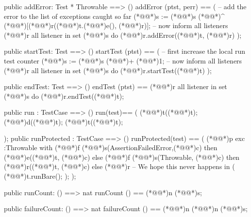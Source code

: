\documentclass[a4paper]{article}
\begin{document}
\begin{vdm_al}
  public addError: Test * Throwable ==> ()
  addError (ptst, perr) ==
    ( -- add the error to the list of exceptions caught so far
      (*@@*)s := (*@@*)s (*@\vdmnotcovered{}@*)^ (*@\vdmnotcovered{}@*)[(*@@*)r((*@@*)t.(*@@*)e(), (*@@*)r)];
      -- now inform all listeners
      (*@@*)r all listener in set (*@@*)s do
        (*@@*)r.addError((*@@*)t, (*@@*)r) );

  public startTest: Test ==> ()
  startTest (ptst) ==
    ( -- first increase the local run test counter
      (*@@*)s := (*@@*)s (*@\vdmnotcovered{}@*)+ (*@\vdmnotcovered{}@*)1;
      -- now inform all listeners
      (*@@*)r all listener in set (*@@*)s do
        (*@@*)r.startTest((*@@*)t) );
  
  public endTest: Test ==> ()
  endTest (ptst) ==
    (*@@*)r all listener in set (*@@*)s do
      (*@@*)r.endTest((*@@*)t);

  public run : TestCase ==> ()
  run(test)==
  ( 
    (*@@*)t((*@@*)t);
    (*@@*)d((*@@*)t);
    (*@@*)t((*@@*)t);

  );
  public runProtected : TestCase ==> () 
  runProtected(test) ==
  (
    (*@@*)p exc :Throwable
        with
          (*@@*)f (*@@*)s(AssertionFailedError,(*@@*)c)
          then (*@@*)e((*@@*)t, (*@@*)c)
          else (*@@*)f (*@@*)s(Throwable, (*@@*)c)
               then (*@@*)r((*@@*)t, (*@@*)c)
               else (*@@*)r -- We hope this never happens
        in (
              (*@@*)t.runBare();
            ); 
  );
  
  public runCount: () ==> nat
  runCount () == (*@@*)n (*@@*)s;
    
  public failureCount: () ==> nat
  failureCount () == (*@@*)n (*@@*)n (*@@*)s;
  

\end{vdm_al}
\end{document}
